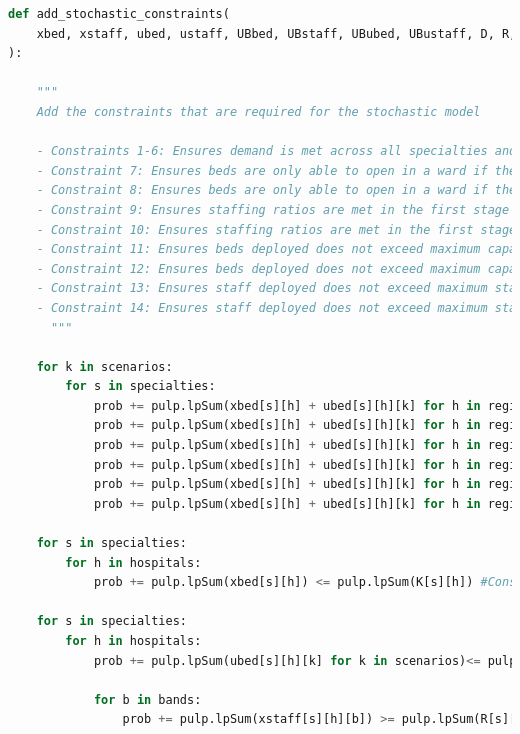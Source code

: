 \documentclass[../thesis.tex]{subfiles}
\begin{document}
\begin{lstlisting}[language=python]
def add_stochastic_constraints(
    xbed, xstaff, ubed, ustaff, UBbed, UBstaff, UBubed, UBustaff, D, R, K, prob, sh, shb, shk, srhk, sbhk
):
    
    """
    Add the constraints that are required for the stochastic model
    
    - Constraints 1-6: Ensures demand is met across all specialties and all regions
    - Constraint 7: Ensures beds are only able to open in a ward if the facilities are able to be opened - 1st stage
    - Constraint 8: Ensures beds are only able to open in a ward if the facilities are able to be opened - 2nd stage
    - Constraint 9: Ensures staffing ratios are met in the first stage
    - Constraint 10: Ensures staffing ratios are met in the first stage
    - Constraint 11: Ensures beds deployed does not exceed maximum capacity of hospital - 1st stage
    - Constraint 12: Ensures beds deployed does not exceed maximum capacity of hospital - 2nd stage
    - Constraint 13: Ensures staff deployed does not exceed maximum staffing resources - 1st stage
    - Constraint 14: Ensures staff deployed does not exceed maximum staffing resources - 2nd stage
      """
        
    for k in scenarios:
        for s in specialties:
            prob += pulp.lpSum(xbed[s][h] + ubed[s][h][k] for h in region1) >= pulp.lpSum(D[s][0][k]) #Constraint 1
            prob += pulp.lpSum(xbed[s][h] + ubed[s][h][k] for h in region2) >= pulp.lpSum(D[s][1][k]) #Constraint 2
            prob += pulp.lpSum(xbed[s][h] + ubed[s][h][k] for h in region3) >= pulp.lpSum(D[s][2][k]) #Constraint 3
            prob += pulp.lpSum(xbed[s][h] + ubed[s][h][k] for h in region4) >= pulp.lpSum(D[s][3][k]) #Constraint 4
            prob += pulp.lpSum(xbed[s][h] + ubed[s][h][k] for h in region5) >= pulp.lpSum(D[s][4][k]) #Constraint 5
            prob += pulp.lpSum(xbed[s][h] + ubed[s][h][k] for h in region6) >= pulp.lpSum(D[s][5][k]) #Constraint 6 
                  
    for s in specialties:
        for h in hospitals:
            prob += pulp.lpSum(xbed[s][h]) <= pulp.lpSum(K[s][h]) #Constraint 7
            
    for s in specialties: 
        for h in hospitals:
            prob += pulp.lpSum(ubed[s][h][k] for k in scenarios)<= pulp.lpSum(K[s][h]) #Constraint 8
            
            for b in bands:
                prob += pulp.lpSum(xstaff[s][h][b]) >= pulp.lpSum(R[s][b]*(xbed[s][h])) #Constraint 9
                

\end{lstlisting}
\end{document}
